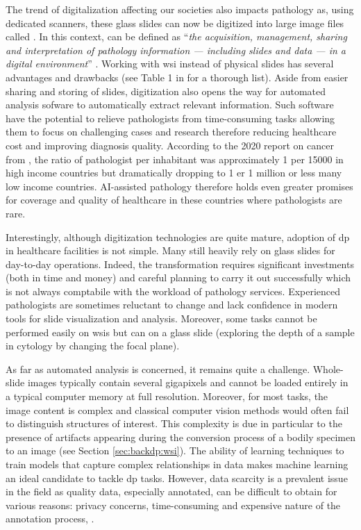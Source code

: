 The trend of digitalization affecting our societies also impacts pathology as, using dedicated scanners, these glass slides can now be digitized into large image files called . In this context,  can be defined as ``\textit{the acquisition, management, sharing and interpretation of pathology information — including slides and data — in a digital environment}'' \parencite{doolan2019whatisdp}. Working with \acrshort{wsi} instead of physical slides has several advantages and drawbacks (see Table 1 in \parencite{jahn2020digital} for a thorough list). Aside from easier sharing and storing of slides, digitization also opens the way for automated analysis sofware to automatically extract relevant information. Such software have the potential to relieve pathologists from time-consuming tasks allowing them to focus on challenging cases and research therefore reducing healthcare cost and improving diagnosis quality. According to the 2020 report on cancer from  \parencite{world2020report}, the ratio of pathologist per inhabitant was approximately 1 per 15000 in high income countries but dramatically dropping to 1 er 1 million or less many low income countries. AI-assisted pathology therefore holds even greater promises for coverage and quality of healthcare in these countries where pathologists are rare.

Interestingly, although digitization technologies are quite mature, adoption of \acrlong{dp} in healthcare facilities is not simple. Many still heavily rely on glass slides for day-to-day operations. Indeed, the transformation requires significant investments (both in time and money) and careful planning to carry it out successfully which is not always comptabile with the workload of pathology services. Experienced pathologists are sometimes reluctant to change and lack confidence in modern tools for slide visualization and analysis. Moreover, some tasks cannot be performed easily on \acrlong{wsi}s but can on a glass slide (\eg exploring the depth of a sample in cytology by changing the focal plane). 

As far as automated analysis is concerned, it remains quite a challenge. Whole-slide images typically contain several gigapixels and cannot be loaded entirely in a typical computer memory at full resolution. Moreover, for most tasks, the image content is complex and classical computer vision methods would often fail to distinguish structures of interest. This complexity is due in particular to the presence of artifacts \parencite{taqi2018review} appearing during the conversion process of a bodily specimen to an image (see Section \ref{sec:backdp:wsi}). The ability of learning techniques to train models that capture complex relationships in data makes machine learning an ideal candidate to tackle \acrlong{dp} tasks. However, data scarcity is a prevalent issue in the field as quality data, especially annotated, can be difficult to obtain for various reasons: privacy concerns, time-consuming and expensive nature of the annotation process, \etc.     

